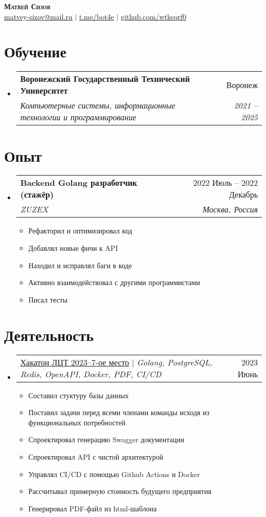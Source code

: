 \documentclass[letterpaper,11pt]{article}
\makeatletter
\newcommand{\resumeItem}[1]{
  \item\small{
    {#1 \vspace{-2pt}}
  }
}
\newcommand{\resumeSubheading}[4]{
  \vspace{-2pt}\item
    \begin{tabular*}{0.97\textwidth}[t]{l@{\extracolsep{\fill}}r}
      \textbf{#1} & #2 \\
      \textit{\small#3} & \textit{\small #4} \\
    \end{tabular*}\vspace{-7pt}
}
\newcommand{\resumeProjectHeading}[2]{
    \item
    \begin{tabular*}{0.97\textwidth}{l@{\extracolsep{\fill}}r}
      \small#1 & #2 \\
    \end{tabular*}\vspace{-7pt}
}
\newcommand{\resumeSubHeadingListStart}{\begin{itemize}[leftmargin=0.15in, label={}]}
\newcommand{\resumeSubHeadingListEnd}{\end{itemize}}
\newcommand{\resumeItemListStart}{\begin{itemize}}
\newcommand{\resumeItemListEnd}{\end{itemize}\vspace{-5pt}}
\makeatother
\begin{document}

\begin{center}
	\textbf{\Huge \scshape Матвей Сизов} \\ \vspace{1pt}
	\href{mailto:matvey-sizov@mail.ru}{\underline{matvey-sizov@mail.ru}} $|$ 
	\href{https://t.me/bot4e}{\underline{t.me/bot4e}} $|$
	\href{https://github.com/wtkeqrf0}{\underline{github.com/wtkeqrf0}}
\end{center}

\section{Обучение}
\resumeSubHeadingListStart
\resumeSubheading
{Воронежский Государственный Технический Университет}{Воронеж}
{Компьютерные системы, информационные технологии и программирование}{2021 -- 2025}
\resumeSubHeadingListEnd

\section{Опыт}
\resumeSubHeadingListStart

\resumeSubheading
{Backend Golang разработчик (стажёр)\emph{}}{2022 Июль -- 2022 Декабрь}
{ZUZEX}{Москва, Россия}
\resumeItemListStart
\resumeItem{Рефакторил и оптимизировал код}
\resumeItem{Добавлял новые фичи к API}
\resumeItem{Находил и исправлял баги в коде}
\resumeItem{Активно взаимодействовал с другими программистами}
\resumeItem{Писал тесты}
\resumeItemListEnd

\resumeSubHeadingListEnd

\section{Деятельность}
\resumeSubHeadingListStart
\resumeProjectHeading
{\href{https://wtkeqrf0.github.io/CV/Leaders_Digital_Transformations_2023.pdf}{\underline{Хакатон ЛЦТ 2023--7-ое место}} $|$ \emph{Golang, PostgreSQL, Redis, OpenAPI, Docker, PDF, CI/CD}}{2023 Июнь}
\resumeItemListStart
\resumeItem{Составил стуктуру базы данных}
\resumeItem{Поставил задачи перед всеми членами команды исходя из функциональных потребностей}
\resumeItem{Спроектировал генерацию Swagger документации}
\resumeItem{Спроектировал API с чистой архитектурой}
\resumeItem{Управлял CI/CD с помощью Github Actions и Docker}
\resumeItem{Рассчитывал примерную стоимость будущего предприятия}
\resumeItem{Генерировал PDF-файл из html-шаблона}
\resumeItemListEnd
\resumeSubHeadingListEnd
\end{document}
